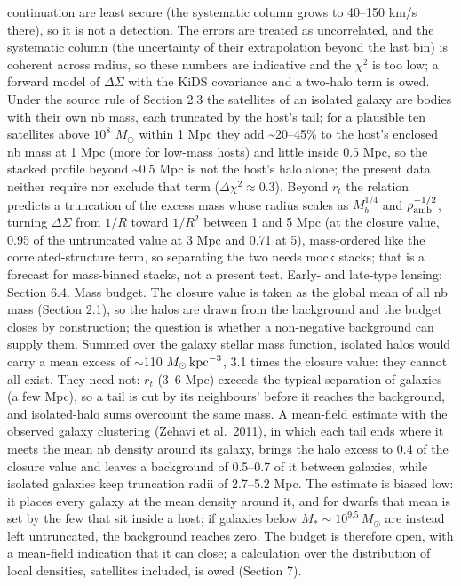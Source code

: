 \documentclass[
  10pt,
]{article}
\begin{document}
continuation are least secure (the systematic column grows to 40--150 km/s there), so it is not a detection. The errors are treated as uncorrelated, and the systematic column (the uncertainty of their extrapolation beyond the last bin) is coherent across radius, so these numbers are indicative and the $\chi^2$ is too low; a forward model of $\Delta\Sigma$ with the KiDS covariance and a two-halo term is owed. Under the source rule of Section 2.3 the satellites of an isolated galaxy are bodies with their own nb mass, each truncated by the host's tail; for a plausible ten satellites above $10^{8}$ $M_\odot$ within 1 Mpc they add \textasciitilde{}20--45\% to the host's enclosed nb mass at 1 Mpc (more for low-mass hosts) and little inside 0.5 Mpc, so the stacked profile beyond \textasciitilde{}0.5 Mpc is not the host's halo alone; the present data neither require nor exclude that term ($\Delta\chi^2\approx0.3$). Beyond $r_t$ the relation predicts a truncation of the excess mass
whose radius scales as $M_b^{1/4}$ and $\rho_{\rm amb}^{-1/2}$, turning
$\Delta\Sigma$ from $1/R$ toward $1/R^2$ between 1 and 5 Mpc (at the closure
value, 0.95 of the untruncated value at 3 Mpc and 0.71 at 5),
mass-ordered like the correlated-structure term, so separating the two needs mock stacks; that is a forecast for mass-binned stacks, not a present test. Early- and late-type lensing: Section 6.4. Mass budget. The closure value is taken as the global mean of all nb mass (Section 2.1), so the halos are drawn from the background and the budget closes by construction; the question is whether a non-negative background can supply them. Summed over the galaxy stellar mass function, isolated halos would carry a mean excess of $\sim$110 $M_\odot\,{\rm kpc}^{-3}$, 3.1 times the closure value: they cannot all exist. They need not: $r_t$ (3--6 Mpc) exceeds the typical separation of galaxies (a few Mpc), so a tail is cut by its neighbours' before it reaches the background, and isolated-halo sums overcount the same mass. A mean-field estimate with the observed galaxy clustering (Zehavi et al.~2011), in which each tail ends where it meets the mean nb density around its galaxy, brings the halo excess to 0.4 of the closure value and leaves a background of 0.5--0.7 of it between galaxies, while isolated galaxies keep truncation radii of 2.7--5.2 Mpc. The estimate is biased low: it places every galaxy at the mean density around it, and for dwarfs that mean is set by the few that sit inside a host; if galaxies below $M_*\sim10^{9.5}\,M_\odot$ are instead left untruncated, the background reaches zero. The budget is therefore open, with a mean-field indication that it can close; a calculation over the distribution of local densities, satellites included, is owed (Section 7).
\end{document}
